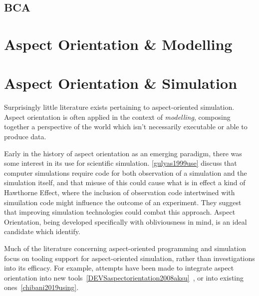 \subsection{BCA}\label{subsec:BCA}

\section{Aspect Orientation \& Modelling}




\section{Aspect Orientation \& Simulation}

Surprisingly little literature exists pertaining to aspect-oriented simulation.
Aspect orientation is often applied in the context of \emph{modelling},
composing together a perspective of the world which isn't necessarily executable
or able to produce data.

Early in the history of aspect orientation as an emerging paradigm, there was
some interest in its use for scientific simulation. \cref{gulyas1999use} discuss
that computer simulations require code for both observation of a simulation and
the simulation itself, and that misuse of this could cause what is in effect a
kind of Hawthorne Effect, where the inclusion
of observation code intertwined with simuilation code might influence the
outcome of an experiment. They suggest that improving simulation technologies
could combat this approach. Aspect Orientation, being developed specifically
with obliviousness in mind, is an ideal candidate which \citeauthor{gulyas1999use}
identify.

Much of the literature concerning aspect-oriented programming and simulation
focus on tooling support for aspect-oriented simulation, rather than
investigations into its efficacy. For example, attempts have been made to
integrate aspect orientation into new
tools~\cref{DEVSaspectorientation2008aksu}~,
or into existing ones~\cref{chibani2019using}. 

